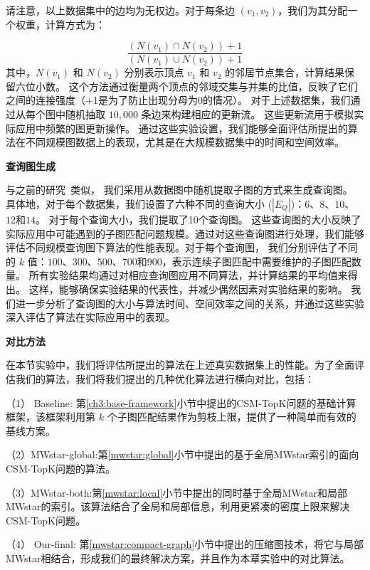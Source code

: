 请注意，以上数据集中的边均为无权边。对于每条边 $(v_1, v_2)$，我们为其分配一个权重，计算方式为：

\[
    \frac{(N(v_1) \cap N(v_2)) + 1}{(N(v_1) \cup N(v_2)) + 1}
\]
其中，$N(v_1)$ 和 $N(v_2)$ 分别表示顶点 $v_1$ 和 $v_2$ 的邻居节点集合，计算结果保留六位小数。
这个方法通过衡量两个顶点的邻域交集与并集的比值，反映了它们之间的连接强度（+1是为了防止出现分母为0的情况）。
对于上述数据集，我们通过从每个图中随机抽取 $10,000$ 条边来构建相应的更新流。
这些更新流用于模拟实际应用中频繁的图更新操作。
通过这些实验设置，我们能够全面评估所提出的算法在不同规模图数据上的表现，尤其是在大规模数据集中的时间和空间效率。


\textbf{查询图生成}
\label{ss-sec:querygen}

与之前的研究~\cite{csm-turboflux-DBLP:conf/sigmod/KimSHLHCSJ18,csm-symbi-DBLP:journals/pvldb/MinPPGIH21,csm-survey:DBLP:journals/pvldb/SunSLH22}类似，
我们采用从数据图中随机提取子图的方式来生成查询图。
具体地，对于每个数据集，我们设置了六种不同的查询大小 ($|E_Q|$)：$6$、$8$、$10$、$12$和$14$。
对于每个查询大小，我们提取了10个查询图。
这些查询图的大小反映了实际应用中可能遇到的子图匹配问题规模。通过对这些查询图进行处理，我们能够评估不同规模查询图下算法的性能表现。对于每个查询图，
我们分别评估了不同的 $k$ 值：$100$、$300$、$500$、$700$和$900$，表示连续子图匹配中需要维护的子图匹配数量。
所有实验结果均通过对相应查询图应用不同算法，并计算结果的平均值来得出。
这样，能够确保实验结果的代表性，并减少偶然因素对实验结果的影响。
我们进一步分析了查询图的大小与算法时间、空间效率之间的关系，并通过这些实验深入评估了算法在实际应用中的表现。

\textbf{对比方法}

在本节实验中，我们将评估所提出的算法在上述真实数据集上的性能。为了全面评估我们的算法，我们将我们提出的几种优化算法进行横向对比，包括：

（1） Baseline: 第\ref{ch3:base-framework}小节中提出的CSM-TopK问题的基础计算框架，该框架利用第 $k$ 个子图匹配结果作为剪枝上限，提供了一种简单而有效的基线方案。

（2）MWstar-global:第\ref{mwstar:global}小节中提出的基于全局MWstar索引的面向CSM-TopK问题的算法。

（3）MWstar-both:第\ref{mwstar:local}小节中提出的同时基于全局MWstar和局部MWstar的索引。该算法结合了全局和局部信息，利用更紧凑的密度上限来解决CSM-TopK问题。

（4） Our-final: 第\ref{mwstar:compact-graph}小节中提出的压缩图技术，将它与局部MWstar相结合，形成我们的最终解决方案，并且作为本章实验中的对比算法。


